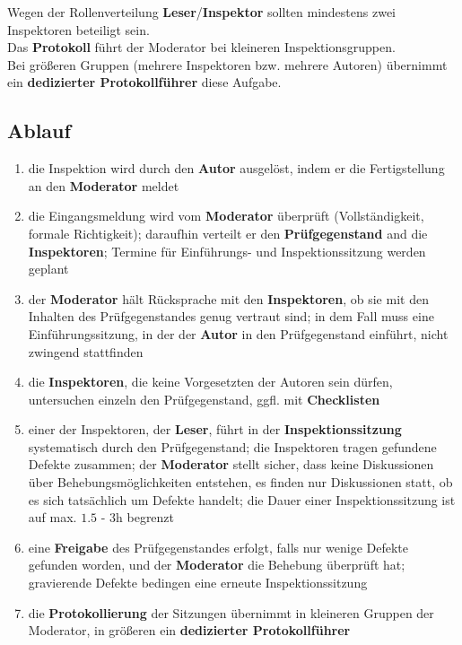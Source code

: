 \noindent
Wegen der Rollenverteilung \textbf{Leser}/\textbf{Inspektor} sollten mindestens zwei Inspektoren beteiligt sein.\\

\noindent
Das \textbf{Protokoll} führt der Moderator bei kleineren Inspektionsgruppen.\\
Bei größeren Gruppen (mehrere Inspektoren bzw. mehrere Autoren) übernimmt ein \textbf{dedizierter Protokollführer} diese Aufgabe.

\subsection{Ablauf}

\begin{enumerate}
    \item die Inspektion wird durch den \textbf{Autor} ausgelöst, indem er die Fertigstellung an den \textbf{Moderator} meldet
    \item die Eingangsmeldung wird vom \textbf{Moderator} überprüft (Vollständigkeit, formale Richtigkeit); daraufhin verteilt er den \textbf{Prüfgegenstand} and die \textbf{Inspektoren}; Termine für Einführungs- und Inspektionssitzung werden geplant
    \item der \textbf{Moderator} hält Rücksprache mit den \textbf{Inspektoren}, ob sie mit den Inhalten des Prüfgegenstandes genug vertraut sind; in dem Fall muss eine Einführungssitzung, in der der \textbf{Autor} in den Prüfgegenstand einführt, nicht zwingend stattfinden
    \item die \textbf{Inspektoren}, die keine Vorgesetzten der Autoren sein dürfen, untersuchen einzeln den Prüfgegenstand, ggfl. mit \textbf{Checklisten}
    \item einer der Inspektoren, der \textbf{Leser},  führt in der \textbf{Inspektionssitzung} systematisch durch den Prüfgegenstand; die Inspektoren tragen gefundene Defekte zusammen; der \textbf{Moderator} stellt sicher, dass keine Diskussionen über Behebungsmöglichkeiten entstehen, es finden nur Diskussionen statt, ob  es sich tatsächlich um Defekte handelt; die Dauer einer Inspektionssitzung ist auf max. $1.5$ - $3$h begrenzt
    \item eine \textbf{Freigabe} des Prüfgegenstandes erfolgt, falls nur wenige Defekte gefunden worden, und der \textbf{Moderator} die Behebung überprüft hat; gravierende Defekte bedingen eine erneute Inspektionssitzung
    \item die \textbf{Protokollierung} der Sitzungen übernimmt in kleineren Gruppen der Moderator, in größeren ein \textbf{dedizierter Protokollführer}
\end{enumerate}

